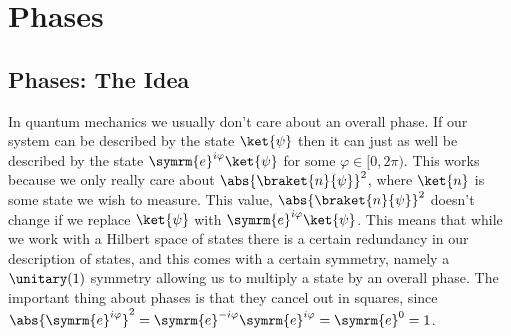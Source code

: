 \documentclass[fleqn]{NotesClass}
\newcommand{\e}{\symrm{e}}
\begin{document}
    \chapter{Phases}
    \section{Phases: The Idea}
    In quantum mechanics we usually don't care about an overall phase.
    If our system can be described by the state \(\ket{\psi}\) then it can just as well be described by the state \(\e^{i\varphi}\ket{\psi}\) for some \(\varphi \in [0, 2\pi)\).
    This works because we only really care about \(\abs{\braket{n}{\psi}}^2\), where \(\ket{n}\) is some state we wish to measure.
    This value, \(\abs{\braket{n}{\psi}}^2\) doesn't change if we replace \(\ket{\psi}\) with \(\e^{i\varphi}\ket{\psi}\).
    This means that while we work with a Hilbert space of states there is a certain redundancy in our description of states, and this comes with a certain symmetry, namely a \(\unitary(1)\) symmetry allowing us to multiply a state by an overall phase.
    The important thing about phases is that they cancel out in squares, since \(\abs{\e^{i\varphi}}^2 = \e^{-i\varphi}\e^{i\varphi} = \e^0 = 1\).
    
\end{document}
